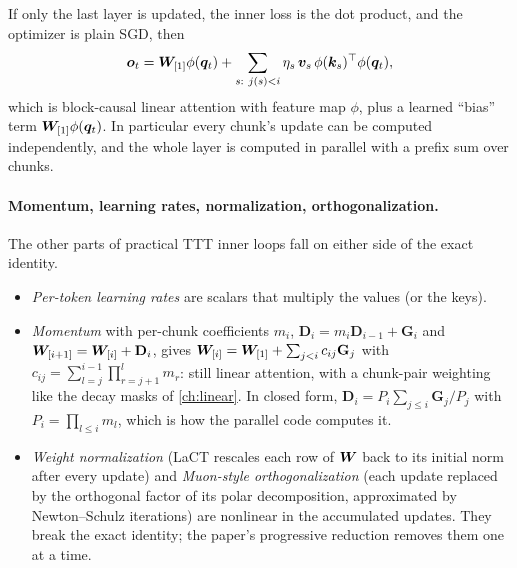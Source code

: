 \begin{corollary}\label{cor:c09-exact}
If only the last layer is updated, the inner loss is the dot product, and the optimizer is
plain SGD, then
\begin{equation}\label{eq:c09-tttla-exact}
  \vo_t = \mW_{[1]}\phi(\vq_t) + \sum_{s:\ j(s)<i}\eta_s\,\vv_s\,\phi(\vk_s)\T\phi(\vq_t),
\end{equation}
which is block-causal linear attention with feature map $\phi$, plus a learned ``bias'' term
$\bm{W}_{[1]}\phi(\bm{q}_t)$. In particular every chunk's update can be computed independently, and
the whole layer is computed in parallel with a prefix sum over chunks.
\end{corollary}

\paragraph{Momentum, learning rates, normalization, orthogonalization.} The other parts of
practical TTT inner loops fall on either side of the exact identity.
\begin{itemize}
  \item \emph{Per-token learning rates} are scalars that multiply the values (or the keys).
  \item \emph{Momentum} with per-chunk coefficients $m_i$,
        $\mathbf{D}_i = m_i\mathbf{D}_{i-1} + \mathbf{G}_i$ and $\bm{W}_{[i+1]} = \bm{W}_{[i]} + \mathbf{D}_i$,
        gives $\bm{W}_{[i]} = \bm{W}_{[1]} + \sum_{j<i}c_{ij}\mathbf{G}_j$ with
        $c_{ij} = \sum_{l=j}^{i-1}\prod_{r=j+1}^{l}m_r$: still linear attention, with a
        chunk-pair weighting like the decay masks of \cref{ch:linear}. In closed form,
        $\mathbf{D}_i = P_i\sum_{j\le i}\mathbf{G}_j/P_j$ with $P_i = \prod_{l\le i}m_l$, which is
        how the parallel code computes it.
  \item \emph{Weight normalization} (LaCT rescales each row of $\bm{W}$ back to its initial norm
        after every update) and \emph{Muon-style orthogonalization} (each update replaced by
        the orthogonal factor of its polar decomposition, approximated by Newton--Schulz
        iterations) are nonlinear in the accumulated updates. They break the exact identity;
        the paper's progressive reduction removes them one at a time.
\end{itemize}

